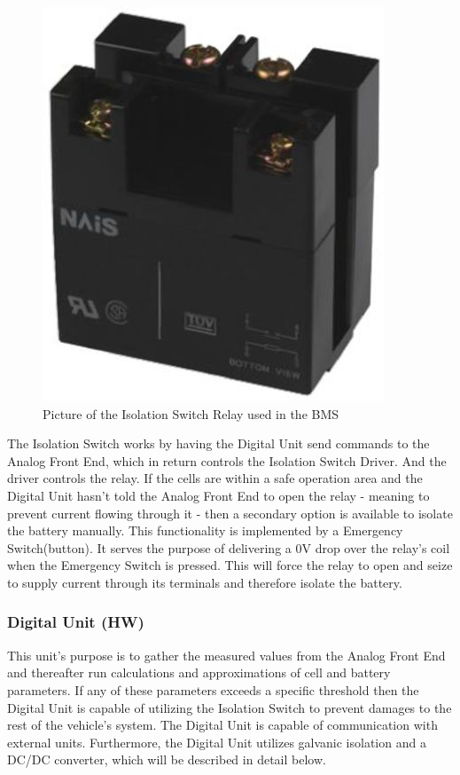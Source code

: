 \begin{figure}[H]
	\centering
	\includegraphics[width=0.3\linewidth]{Hardware/Pictures/BMSRelay}
	\caption[Empty]{Picture of the Isolation Switch Relay used in the BMS\footnotemark}
	\label{fig:BMSRelay}
\end{figure}

The Isolation Switch works by having the Digital Unit send commands to the Analog Front End, which in return controls the Isolation Switch Driver. And the driver controls the relay. If the cells are within a safe operation area and the Digital Unit hasn't told the Analog Front End to open the relay - meaning to prevent current flowing through it - then a secondary option is available to isolate the battery manually. This functionality is implemented by a Emergency Switch(button). It serves the purpose of delivering a 0V drop over the relay's coil when the Emergency Switch is pressed. This will force the relay to open and seize to supply current through its terminals and therefore isolate the battery.

\subsubsection{Digital Unit (HW)}
This unit's purpose is to gather the measured values from the Analog Front End and thereafter run calculations and approximations of cell and battery parameters. If any of these parameters exceeds a specific threshold then the Digital Unit is capable of utilizing the Isolation Switch to prevent damages to the rest of the vehicle's system. The Digital Unit is capable of communication with external units. Furthermore, the Digital Unit utilizes galvanic isolation and a DC/DC converter, which will be described in detail below. 

